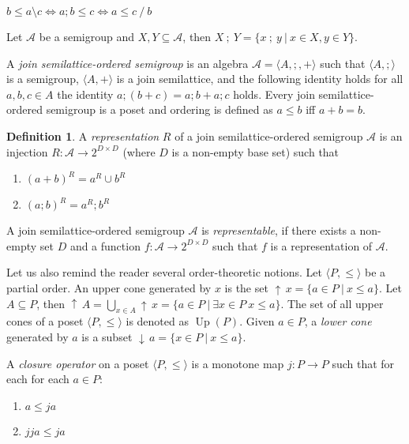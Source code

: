 \documentclass[a4paper]{article}
\theoremstyle{definition}
\newtheorem{definition}{Definition}
\theoremstyle{theorem}
\theoremstyle{proposition}
\theoremstyle{lemma}
\theoremstyle{ex}
\theoremstyle{corollary}
\theoremstyle{claim}
\newcommand{\down}[1]{\ensuremath{{\downarrow}\,#1}}
\newcommand{\up}[1]{\ensuremath{{\uparrow}\,#1}}
\begin{document}
  \begin{center}
    $b \leq a \setminus c \Leftrightarrow a ; b \leq c \Leftrightarrow a \leq c \: / \: b$
  \end{center}

Let $\mathcal{A}$ be a semigroup and $X, Y \subseteq \mathcal{A}$, then $X \: ; \: Y = \{ x \: ; \: y \: | \: x \in X, y \in Y \}$.

A \emph{join semilattice-ordered semigroup} is an algebra $\mathcal{A} = \langle A, ;, + \rangle$ such that $\langle A, ; \rangle$ is a semigroup, $\langle A, + \rangle$ is a join semilattice, and the following identity holds for all $a, b, c \in A$ the identity $a ; (b + c) = a ; b + a ; c$ holds.
Every join semilattice-ordered semigroup is a poset and ordering is defined as $a \leq b$ iff $a + b = b$.

\begin{definition}\label{joinrep}
  A \emph{representation} $R$ of a join semilattice-ordered semigroup $\mathcal{A}$
  is an injection $R : \mathcal{A} \to 2^{D \times D}$ (where $D$ is a non-empty base set) such that
  \begin{enumerate}
    \item $(a + b)^R = a^R \cup b^R$
    \item $(a ; b)^R = a^R ; b^R$
  \end{enumerate}
\end{definition}

A join semilattice-ordered semigroup $\mathcal{A}$ is \emph{representable}, if there exists a non-empty set $D$ and a function $f : \mathcal{A} \to 2^{D \times D}$ such that $f$ is a representation of $\mathcal{A}$.

Let us also remind the reader several order-theoretic notions. Let $\langle P, \leq \rangle$ be a partial order. An upper cone generated by $x$ is the set $\up{x} = \{ a \in P \: | \: x \leq a \}$. Let $A \subseteq P$, then $\up{A} = \bigcup \limits_{x \in A} \up{x} = \{ a \in P \: | \: \exists x \in P \: x \leq a \}$. The set of all upper cones of a poset $\langle P, \leq \rangle$ is denoted as $\operatorname{Up}(P)$. Given $a \in P$, a \emph{lower cone} generated by $a$ is a subset $\down{a} = \{ x \in P \: | \: x \leq a \}$.

A \emph{closure operator} on a poset $\langle P, \leq \rangle$ is a monotone map $j : P \to P$
such that for each for each $a \in P$:
\begin{enumerate}
  \item $a \leq j a$
  \item $j j a \leq j a$
\end{enumerate}
\end{document}
